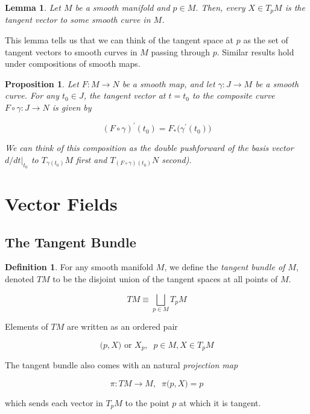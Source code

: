 \documentclass{article}
\newtheorem{proposition}[theorem]{Proposition}
\newtheorem{lemma}[theorem]{Lemma}
\theoremstyle{remark}
\theoremstyle{definition}
\newtheorem{definition}{Definition}[section]
\begin{document}
    \begin{lemma}
      Let $M$ be a smooth manifold and $p \in M$. Then, every $X \in T_p M$ is the tangent vector to some smooth curve in $M$. 
    \end{lemma}

    This lemma tells us that we can think of the tangent space at $p$ as the set of tangent vectors to smooth curves in $M$ passing through $p$. Similar results hold under compositions of smooth maps. 

    \begin{proposition}
      Let $F: M \longrightarrow N$ be a smooth map, and let $\gamma: J \longrightarrow M$ be a smooth curve. For any $t_0 \in J$, the tangent vector at $t = t_0$ to the composite curve $F \circ \gamma: J \longrightarrow N$ is given by 

        \[(F \circ \gamma)^\prime (t_0) = F_* \big( \gamma^\prime (t_0) \big)\]

      We can think of this composition as the double pushforward of the basis vector $d/dt \big|_{t_0}$ to $T_{\gamma(t_0)} M$ first and $T_{(F \circ \gamma)(t_0)} N$ second). 
    \end{proposition}

\section{Vector Fields}

  \subsection{The Tangent Bundle}

    \begin{definition}
      For any smooth manifold $M$, we define the \textit{tangent bundle of $M$}, denoted $TM$ to be the disjoint union of the tangent spaces at all points of $M$. 

        \[TM \equiv \bigsqcup_{p \in M} T_p M\]

      Elements of $TM$ are written as an ordered pair 

        \[\big(p, X \big) \text{ or } X_p, \;\; p \in M, X \in T_p M\]

      The tangent bundle also comes with an natural \textit{projection map}

        \[\pi: TM \longrightarrow M, \;\; \pi \big(p, X\big) = p\]

      which sends each vector in $T_p M$ to the point $p$ at which it is tangent. 
    \end{definition}
\end{document}
